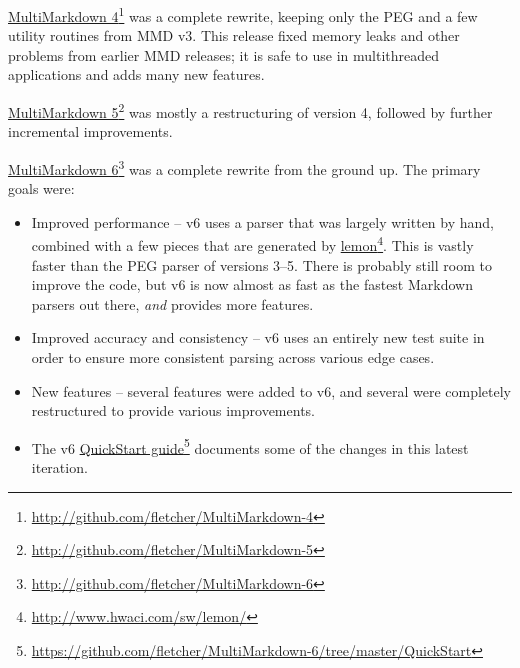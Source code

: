 \href{http://github.com/fletcher/MultiMarkdown-4}{MultiMarkdown 4}\footnote{\href{http://github.com/fletcher/MultiMarkdown-4}{http:\slash{}\slash{}github.com\slash{}fletcher\slash{}MultiMarkdown-4}} was a complete rewrite, keeping only the PEG and a few utility routines from \gls{MMD} v3. This release fixed memory leaks and other problems from earlier \gls{MMD} releases; it is safe to use in multithreaded applications and adds many new features.

\href{http://github.com/fletcher/MultiMarkdown-5}{MultiMarkdown 5}\footnote{\href{http://github.com/fletcher/MultiMarkdown-5}{http:\slash{}\slash{}github.com\slash{}fletcher\slash{}MultiMarkdown-5}} was mostly a restructuring of version 4, followed by further incremental improvements.

\href{http://github.com/fletcher/MultiMarkdown-6}{MultiMarkdown 6}\footnote{\href{http://github.com/fletcher/MultiMarkdown-6}{http:\slash{}\slash{}github.com\slash{}fletcher\slash{}MultiMarkdown-6}} was a complete rewrite from the ground up. The primary goals were:

\begin{itemize}
\item Improved performance -- v6 uses a parser that was largely written by hand, combined with a few pieces that are generated by \href{http://www.hwaci.com/sw/lemon/}{lemon}\footnote{\href{http://www.hwaci.com/sw/lemon/}{http:\slash{}\slash{}www.hwaci.com\slash{}sw\slash{}lemon\slash{}}}. This is vastly faster than the PEG parser of versions 3--5. There is probably still room to improve the code, but v6 is now almost as fast as the fastest Markdown parsers out there, \emph{and} provides more features.

\item Improved accuracy and consistency -- v6 uses an entirely new test suite in order to ensure more consistent parsing across various edge cases.

\item New features -- several features were added to v6, and several were completely restructured to provide various improvements.

\item The v6 \href{https://github.com/fletcher/MultiMarkdown-6/tree/master/QuickStart}{QuickStart guide}\footnote{\href{https://github.com/fletcher/MultiMarkdown-6/tree/master/QuickStart}{https:\slash{}\slash{}github.com\slash{}fletcher\slash{}MultiMarkdown-6\slash{}tree\slash{}master\slash{}QuickStart}} documents some of the changes in this latest iteration.

\end{itemize}

